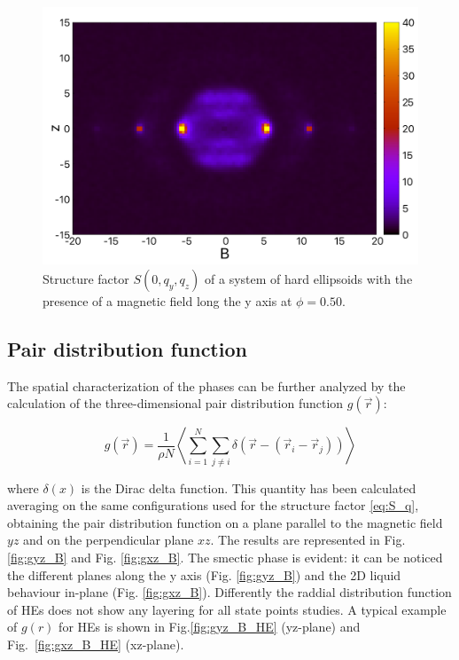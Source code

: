 \documentclass{article}
\begin{document}
\begin{figure}
    \centering
    \includegraphics[width=1\columnwidth]{Syz_B.png}
    \caption{Structure factor $S(0, q_y, q_z)$ of a system of hard ellipsoids with the presence of a magnetic field long the y axis at $\phi=0.50$.}
    \label{fig:Syz_B_HE}
\end{figure}

\subsection{Pair distribution function}

The spatial characterization of the phases can be further analyzed by  the calculation of the three-dimensional pair distribution function $g(\vec{r})$:

\begin{equation}
    g(\vec{r}) = \frac{1}{\rho N} \left\langle \sum_{i=1}^N \sum_{j\neq i} \delta \left( \vec{r} - \left( \vec{r}_i - \vec{r}_j \right) \right) \right\rangle
\end{equation}

where $\delta(x)$ is the Dirac delta function. This quantity has been calculated averaging on the same configurations used for the structure factor \ref{eq:S_q}, obtaining the pair distribution function on a plane parallel to the magnetic field $yz$ and on the perpendicular plane $xz$. The results are represented in Fig. \ref{fig:gyz_B} and Fig. \ref{fig:gxz_B}. The smectic phase is evident: it can be noticed the different planes along the y axis (Fig. \ref{fig:gyz_B}) and the 2D liquid behaviour in-plane (Fig. \ref{fig:gxz_B}).
Differently the raddial distribution function of HEs does not show any layering for all state points studies.
A typical example of $g(r)$ for HEs is shown in Fig.\ref{fig:gyz_B_HE} (yz-plane) and Fig.~\ref{fig:gxz_B_HE} (xz-plane). 
\end{document}
